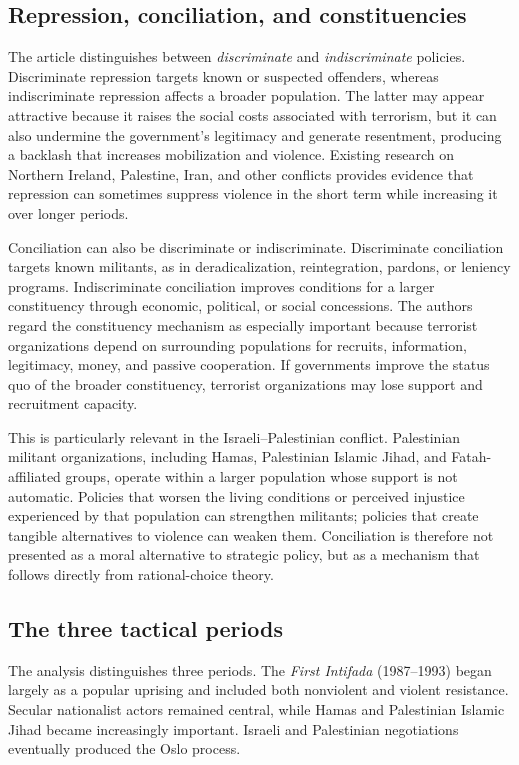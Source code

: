 \subsection{Repression, conciliation, and constituencies}

The article distinguishes between \textit{discriminate} and \textit{indiscriminate} policies. Discriminate repression targets known or suspected offenders, whereas indiscriminate repression affects a broader population. The latter may appear attractive because it raises the social costs associated with terrorism, but it can also undermine the government's legitimacy and generate resentment, producing a backlash that increases mobilization and violence. Existing research on Northern Ireland, Palestine, Iran, and other conflicts provides evidence that repression can sometimes suppress violence in the short term while increasing it over longer periods.

Conciliation can also be discriminate or indiscriminate. Discriminate conciliation targets known militants, as in deradicalization, reintegration, pardons, or leniency programs. Indiscriminate conciliation improves conditions for a larger constituency through economic, political, or social concessions. The authors regard the constituency mechanism as especially important because terrorist organizations depend on surrounding populations for recruits, information, legitimacy, money, and passive cooperation. If governments improve the status quo of the broader constituency, terrorist organizations may lose support and recruitment capacity.

This is particularly relevant in the Israeli--Palestinian conflict. Palestinian militant organizations, including Hamas, Palestinian Islamic Jihad, and Fatah-affiliated groups, operate within a larger population whose support is not automatic. Policies that worsen the living conditions or perceived injustice experienced by that population can strengthen militants; policies that create tangible alternatives to violence can weaken them. Conciliation is therefore not presented as a moral alternative to strategic policy, but as a mechanism that follows directly from rational-choice theory.

\subsection{The three tactical periods}

The analysis distinguishes three periods. The \textit{First Intifada} (1987--1993) began largely as a popular uprising and included both nonviolent and violent resistance. Secular nationalist actors remained central, while Hamas and Palestinian Islamic Jihad became increasingly important. Israeli and Palestinian negotiations eventually produced the Oslo process.

